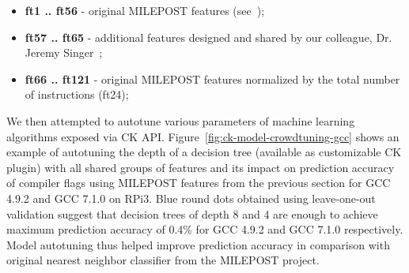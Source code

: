 \begin{itemize}
  \item {\bf ft1 .. ft56} - original MILEPOST features (see~\cite{29db2248aba45e59:a31e374796869125});
  \item {\bf ft57 .. ft65} - additional features designed and shared by our colleague, Dr. Jeremy Singer~\cite{all-milepost-features};
  \item {\bf ft66 .. ft121} - original MILEPOST features normalized by the total number of instructions (ft24);
\end{itemize}

We then attempted to autotune various parameters
of machine learning algorithms exposed via CK API.
%
Figure~\ref{fig:ck-model-crowdtuning-gcc}
shows an example of autotuning the depth of a decision tree
(available as customizable CK plugin) with all shared groups of features
and its impact on prediction accuracy of compiler flags using MILEPOST
features from the previous section for GCC 4.9.2 and GCC 7.1.0
on RPi3.
%
Blue round dots obtained using leave-one-out validation suggest 
that decision trees of depth 8 and 4 are enough 
to achieve maximum prediction accuracy of 0.4\% for GCC 4.9.2 
and GCC 7.1.0 respectively.
%
Model autotuning thus helped improve prediction accuracy in comparison 
with original nearest neighbor classifier from the MILEPOST project. 

